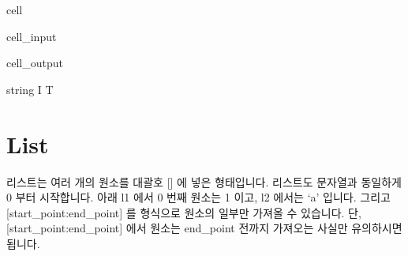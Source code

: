 \documentclass[letterpaper,10pt,english]{jupyterBook}
\begin{document}
\begin{sphinxuseclass}{cell}\begin{sphinxVerbatimInput}

\begin{sphinxuseclass}{cell_input}
\begin{sphinxVerbatim}[commandchars=\\\{\}]
  
  

\PYG{p}{[}\PYG{p}{]} \PYG{p}{[}\PYG{p}{]} 
\end{sphinxVerbatim}

\end{sphinxuseclass}\end{sphinxVerbatimInput}
\begin{sphinxVerbatimOutput}

\begin{sphinxuseclass}{cell_output}
\begin{sphinxVerbatim}[commandchars=\\\{\}]
string
I T
\end{sphinxVerbatim}

\end{sphinxuseclass}\end{sphinxVerbatimOutput}

\end{sphinxuseclass}

\part{List}
\label{\detokenize{chapter2/2.1.1_Python_Basics:list}}
\sphinxAtStartPar
리스트는 여러 개의 원소를 대괄호 {[}{]} 에 넣은 형태입니다. 리스트도 문자열과 동일하게 0 부터 시작합니다.
아래 l1 에서 0 번째 원소는 1 이고, l2 에서는 ‘a’ 입니다. 그리고 {[}start\_point:end\_point{]} 를 형식으로 원소의 일부만 가져올 수 있습니다. 단, {[}start\_point:end\_point{]} 에서 원소는 end\_point 전까지 가져오는 사실만 유의하시면 됩니다.
\end{document}
